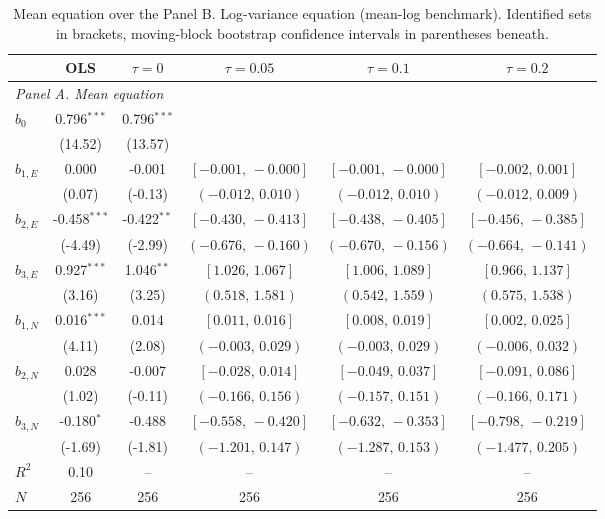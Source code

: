 \documentclass[11pt]{article}
\begin{document}
\begin{table}[!htbp]
\centering
\begin{threeparttable}
\caption{Mean equation over the Panel B. Log-variance equation (mean-log benchmark). Identified sets in brackets, moving-block bootstrap confidence intervals in parentheses beneath.}
\label{tab:log_var_eq_panel_logols}
\scriptsize\setlength{\tabcolsep}{3pt}
\begin{tabular}{lccccc}
\toprule
 & OLS & $\tau{=}0$ & $\tau{=}0.05$ & $\tau{=}0.1$ & $\tau{=}0.2$ \\
\midrule
\multicolumn{6}{l}{\textit{Panel A. Mean equation}} \\
\midrule
$b_0$ & 0.796$^{***}$ & 0.796$^{***}$ &  &  &  \\
 & (14.52) & (13.57) &  &  &  \\
$b_{1,E}$ & 0.000 & -0.001 & $[-0.001,\,-0.000]$ & $[-0.001,\,-0.000]$ & $[-0.002,\,0.001]$ \\
 & (0.07) & (-0.13) & $(-0.012,\,0.010)$ & $(-0.012,\,0.010)$ & $(-0.012,\,0.009)$ \\
$b_{2,E}$ & -0.458$^{***}$ & -0.422$^{**}$ & $[-0.430,\,-0.413]$ & $[-0.438,\,-0.405]$ & $[-0.456,\,-0.385]$ \\
 & (-4.49) & (-2.99) & $(-0.676,\,-0.160)$ & $(-0.670,\,-0.156)$ & $(-0.664,\,-0.141)$ \\
$b_{3,E}$ & 0.927$^{***}$ & 1.046$^{**}$ & $[1.026,\,1.067]$ & $[1.006,\,1.089]$ & $[0.966,\,1.137]$ \\
 & (3.16) & (3.25) & $(0.518,\,1.581)$ & $(0.542,\,1.559)$ & $(0.575,\,1.538)$ \\
\midrule
$b_{1,N}$ & 0.016$^{***}$ & 0.014 & $[0.011,\,0.016]$ & $[0.008,\,0.019]$ & $[0.002,\,0.025]$ \\
 & (4.11) & (2.08) & $(-0.003,\,0.029)$ & $(-0.003,\,0.029)$ & $(-0.006,\,0.032)$ \\
$b_{2,N}$ & 0.028 & -0.007 & $[-0.028,\,0.014]$ & $[-0.049,\,0.037]$ & $[-0.091,\,0.086]$ \\
 & (1.02) & (-0.11) & $(-0.166,\,0.156)$ & $(-0.157,\,0.151)$ & $(-0.166,\,0.171)$ \\
$b_{3,N}$ & -0.180$^{*}$ & -0.488 & $[-0.558,\,-0.420]$ & $[-0.632,\,-0.353]$ & $[-0.798,\,-0.219]$ \\
 & (-1.69) & (-1.81) & $(-1.201,\,0.147)$ & $(-1.287,\,0.153)$ & $(-1.477,\,0.205)$ \\
\midrule
$R^2$ & 0.10 & -- & -- & -- & -- \\
$N$ & 256 & 256 & 256 & 256 & 256 \\

\end{tabular}
\end{threeparttable}
\end{table}
\end{document}
